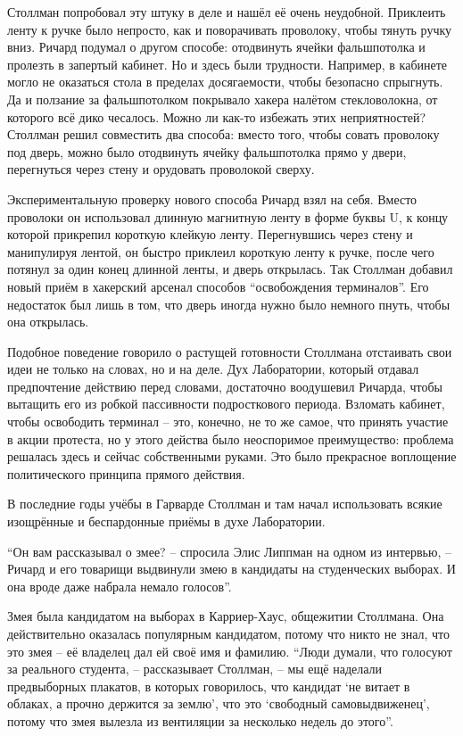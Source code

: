 Столлман попробовал эту штуку в деле и нашёл её очень неудобной. Приклеить ленту к ручке было непросто, как и поворачивать проволоку, чтобы тянуть ручку вниз. Ричард подумал о другом способе: отодвинуть ячейки фальшпотолка и пролезть в запертый кабинет. Но и здесь были трудности. Например, в кабинете могло не оказаться стола в пределах досягаемости, чтобы безопасно спрыгнуть. Да и ползание за фальшпотолком покрывало хакера налётом стекловолокна, от которого всё дико чесалось. Можно ли как-то избежать этих неприятностей? Столлман решил совместить два способа: вместо того, чтобы совать проволоку под дверь, можно было отодвинуть ячейку фальшпотолка прямо у двери, перегнуться через стену и орудовать проволокой сверху.

Экспериментальную проверку нового способа Ричард взял на себя. Вместо проволоки он использовал длинную магнитную ленту в форме буквы U, к концу которой прикрепил короткую клейкую ленту. Перегнувшись через стену и манипулируя лентой, он быстро приклеил короткую ленту к ручке, после чего потянул за один конец длинной ленты, и дверь открылась. Так Столлман добавил новый приём в хакерский арсенал способов \enquote{освобождения терминалов}. Его недостаток был лишь в том, что дверь иногда нужно было немного пнуть, чтобы она открылась.

Подобное поведение говорило о растущей готовности Столлмана отстаивать свои идеи не только на словах, но и на деле. Дух Лаборатории, который отдавал предпочтение действию перед словами, достаточно воодушевил Ричарда, чтобы вытащить его из робкой пассивности подросткового периода. Взломать кабинет, чтобы освободить терминал -- это, конечно, не то же самое, что принять участие в акции протеста, но у этого действа было неоспоримое преимущество: проблема решалась здесь и сейчас собственными руками. Это было прекрасное воплощение политического принципа прямого действия.

В последние годы учёбы в Гарварде Столлман и там начал использовать всякие изощрённые и беспардонные приёмы в духе Лаборатории.

\enquote{Он вам рассказывал о змее? -- спросила Элис Липпман на одном из интервью, -- Ричард и его товарищи выдвинули змею в кандидаты на студенческих выборах. И она вроде даже набрала немало голосов}.

Змея была кандидатом на выборах в Карриер-Хаус, общежитии Столлмана. Она действительно оказалась популярным кандидатом, потому что никто не знал, что это змея -- её владелец дал ей своё имя и фамилию. \enquote{Люди думали, что голосуют за реального студента, -- рассказывает Столлман, -- мы ещё наделали предвыборных плакатов, в которых говорилось, что кандидат \enquote{не витает в облаках, а прочно держится за землю}, что это \enquote{свободный самовыдвиженец}, потому что змея вылезла из вентиляции за несколько недель до этого}.

